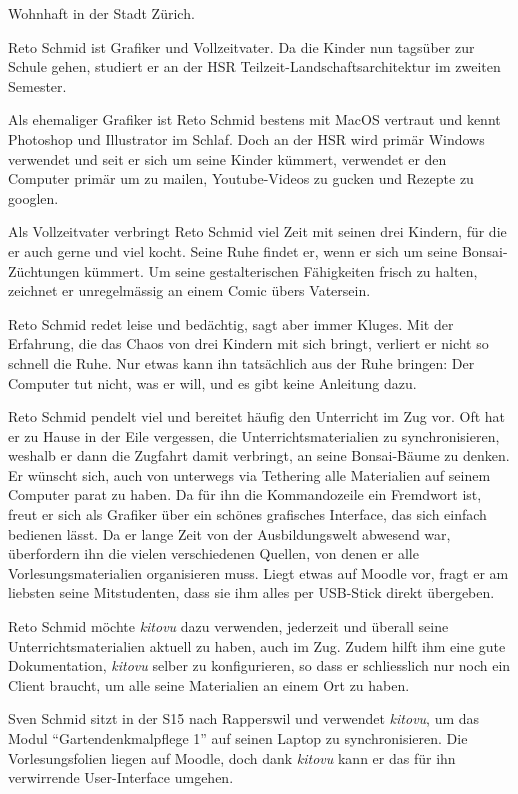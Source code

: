 \documentclass[a4paper]{article}
\begin{document}
\begin{description}[uclist]
	\item[Adresse] Wohnhaft in der Stadt Zürich.
	\item[Ausbildung und Beruf] Reto Schmid ist Grafiker und Vollzeitvater. Da die Kinder nun tagsüber zur Schule gehen, studiert er an der HSR Teilzeit-Landschaftsarchitektur im zweiten Semester.
	\item[Informatikkenntnisse] Als ehemaliger Grafiker ist Reto Schmid bestens mit MacOS vertraut und kennt Photoshop und Illustrator im Schlaf. Doch an der HSR wird primär Windows verwendet und seit er sich um seine Kinder kümmert, verwendet er den Computer primär um zu mailen, Youtube-Videos zu gucken und Rezepte zu googlen.
	\item[Freizeitbeschäftigung] Als Vollzeitvater verbringt Reto Schmid viel Zeit mit seinen drei Kindern, für die er auch gerne und viel kocht. Seine Ruhe findet er, wenn er sich um seine Bonsai-Züchtungen kümmert. Um seine gestalterischen Fähigkeiten frisch zu halten, zeichnet er unregelmässig an einem Comic übers Vatersein.
	\item[Persönlichkeit] Reto Schmid redet leise und bedächtig, sagt aber immer Kluges. Mit der Erfahrung, die das Chaos von drei Kindern mit sich bringt, verliert er nicht so schnell die Ruhe. Nur etwas kann ihn tatsächlich aus der Ruhe bringen: Der Computer tut nicht, was er will, und es gibt keine Anleitung dazu.
	\item[Einschränkungen, Ziele und Wünsche] Reto Schmid pendelt viel und bereitet häufig den Unterricht im Zug vor. Oft hat er zu Hause in der Eile vergessen, die Unterrichtsmaterialien zu synchronisieren, weshalb er dann die Zugfahrt damit verbringt, an seine Bonsai-Bäume zu denken. Er wünscht sich, auch von unterwegs via Tethering alle Materialien auf seinem Computer parat zu haben. Da für ihn die Kommandozeile ein Fremdwort ist, freut er sich als Grafiker über ein schönes grafisches Interface, das sich einfach bedienen lässt. Da er lange Zeit von der Ausbildungswelt abwesend war, überfordern ihn die vielen verschiedenen Quellen, von denen er alle Vorlesungsmaterialien organisieren muss. Liegt etwas auf Moodle vor, fragt er am liebsten seine Mitstudenten, dass sie ihm alles per USB-Stick direkt übergeben.
	\item[Erwartungen an \emph{kitovu}] Reto Schmid möchte \emph{kitovu} dazu verwenden, jederzeit und überall seine Unterrichtsmaterialien aktuell zu haben, auch im Zug. Zudem hilft ihm eine gute Dokumentation, \emph{kitovu} selber zu konfigurieren, so dass er schliesslich nur noch ein Client braucht, um alle seine Materialien an einem Ort zu haben.
	\item[Szenario: ``Unterwegs''] Sven Schmid sitzt in der S15 nach Rapperswil und verwendet \emph{kitovu}, um das Modul ``Gartendenkmalpflege 1'' auf seinen Laptop zu synchronisieren. Die Vorlesungsfolien liegen auf Moodle, doch dank \emph{kitovu} kann er das für ihn verwirrende User-Interface umgehen.
\end{description}
\end{document}

